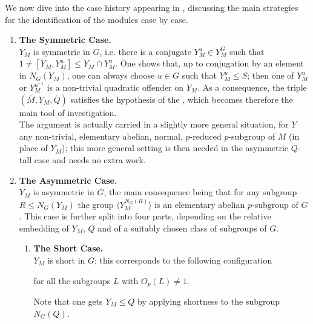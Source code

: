 \documentclass{amsart}
\numberwithin{equation}{section}
\theoremstyle{definition}
\theoremstyle{subresult}
\theoremstyle{caseresult}
\newcommand{\ov}{\overline}
\newcommand{\inv}{^{-1}}
\newcommand{\<}{\langle}
\renewcommand{\>}{\rangle}
\begin{document}
We now dive into the case history appearing in \cite{Meier-Stell-Stroth:2012}, discussing the main strategies for the identification of the modules case by case.
\begin{enumerate}
	\item[(Sym)] {\bf The Symmetric Case.}\\
		 $Y_M$ is symmetric in $G$, i.e. there is a conjugate $Y_M^u \in Y_M^G$ such that $1 \ne [Y_M,Y_M^u] \le Y_M \cap Y_M^u$. One shows that, up to conjugation by an element in $N_G(Y_M)$, one can always choose $u \in G$ such that $Y_M^u \le S$; then one of $Y_M^u$ or $Y_M^{u\inv}$ is a non-trivial quadratic offender on $Y_M$. As a consequence, the triple $(\ov{M},Y_M,\ov{Q})$ satisfies the hypothesis of the , which becomes therefore the main tool of investigation.\\
		 The argument is actually carried in a slightly more general situation, for $Y$ any non-trivial, elementary abelian, normal, $p$-reduced $p$-subgroup of $M$ (in place of $Y_M$); this more general setting is then needed in the asymmetric $Q$-tall case and needs no extra work.
	\item[(Asym)] {\bf The Asymmetric Case.}\\
		$Y_M$ is asymmetric in $G$, the main consequence being that for any subgroup $R \le N_G(Y_M)$ the group $\< Y_M^{N_G(R)} \>$ is an elementary abelian $p$-subgroup of $G$. This case is further split into four parts, depending on the relative embedding of $Y_M$, $Q$ and of a suitably chosen class of subgroups of $G$.
			\begin{enumerate}[label=(Asym: \alph*), itemindent=0.5cm]
				\item {\bf The Short Case.}\\
					 $Y_M$ is short in $G$; this corresponds to the following configuration
					 \begin{center}
                        for all the subgroups $L$ with $O_p(L) \ne 1$.
					 \end{center}
				Note that one gets $Y_M \le Q$ by applying shortness to the subgroup $N_G(Q)$.\\

\end{enumerate}
\end{enumerate}
\end{document}
